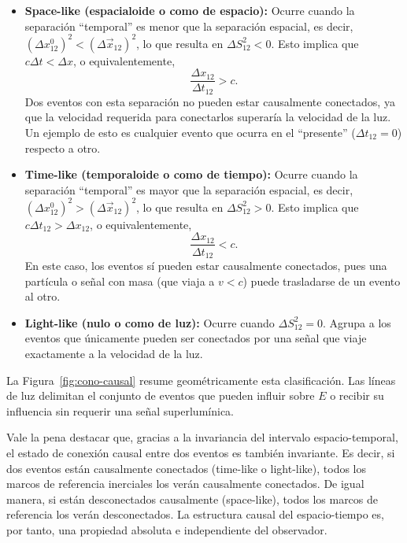 \begin{itemize}
    \item \textbf{Space-like (espacialoide o como de espacio):} Ocurre cuando la separación ``temporal'' es menor que la separación espacial, es decir, $(\Delta x^0_{12})^2 < (\Delta \vec{x}_{12})^2$, lo que resulta en $\Delta S^2_{12} < 0$. Esto implica que $c\Delta t < \Delta x$, o equivalentemente,
    $$
    \frac{\Delta x_{12}}{\Delta t_{12}} > c.
    $$
    Dos eventos con esta separación no pueden estar causalmente conectados, ya que la velocidad requerida para conectarlos superaría la velocidad de la luz. Un ejemplo de esto es cualquier evento que ocurra en el ``presente'' ($\Delta t_{12} = 0$) respecto a otro.

    \item \textbf{Time-like (temporaloide o como de tiempo):} Ocurre cuando la separación ``temporal'' es mayor que la separación espacial, es decir, $(\Delta x^0_{12})^2 > (\Delta \vec{x}_{12})^2$, lo que resulta en $\Delta S^2_{12} > 0$. Esto implica que $c\Delta t_{12} > \Delta x_{12}$, o equivalentemente,
    $$
    \frac{\Delta x_{12}}{\Delta t_{12}} < c.
    $$
    En este caso, los eventos sí pueden estar causalmente conectados, pues una partícula o señal con masa (que viaja a $v < c$) puede trasladarse de un evento al otro.

    \item \textbf{Light-like (nulo o como de luz):} Ocurre cuando $\Delta S^2_{12} = 0$. Agrupa a los eventos que únicamente pueden ser conectados por una señal que viaje exactamente a la velocidad de la luz.
\end{itemize}

La Figura~\ref{fig:cono-causal} resume geométricamente esta clasificación. Las líneas de luz delimitan el conjunto de eventos que pueden influir sobre $E$ o recibir su influencia sin requerir una señal superlumínica.



Vale la pena destacar que, gracias a la invariancia del intervalo espacio-temporal, el estado de conexión causal entre dos eventos es también invariante. Es decir, si dos eventos están causalmente conectados (time-like o light-like), todos los marcos de referencia inerciales los verán causalmente conectados. De igual manera, si están desconectados causalmente (space-like), todos los marcos de referencia los verán desconectados. La estructura causal del espacio-tiempo es, por tanto, una propiedad absoluta e independiente del observador.

